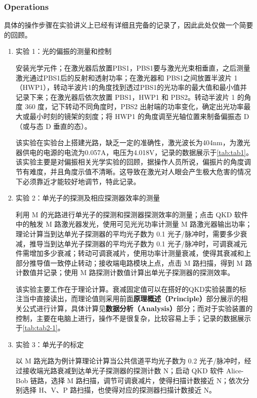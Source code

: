 \subsubsection{Operations}
具体的操作步骤在实验讲义上已经有详细且完备的记录了，因此此处仅做一个简要的回顾。
\begin{enumerate}
	\item 实验 1：光的偏振的测量和控制
	
	安装光学元件；在激光器后放置PBS1，PBS1要与激光光束相垂直，之后测量激光通过PBS1后的反射和透射功率；在激光器和 PBS1之间放置半波片 1（HWP1），转动半波片1的角度找到透过PBS1的光功率的最大值和最小值并记录下来；在激光器后依次放置 PBS1，HWP1 和 PBS2。转动半波片 1 的角度 360 度，记下转动不同角度时，PBS2 出射端的功率变化，确定出光功率最大或最小时刻的镜架的刻度；将 HWP1 的角度调至光轴位置来制备偏振态 D（或与态
	D 垂直的态）。
	
	该实验在实验台上搭建光路，缺乏一定的准确性，激光波长为404nm，为激光器供电的电源的电流为0.057A，电压为4.018V，记录的数据展示于\cref{tab:tab1}。该实验主要是对偏振相关光学实验的回顾，据操作人员所说，偏振片的角度调节有难度，并且角度示值不清晰。这导致在激光对人眼会产生极大危害的情况下必须靠近才能较好地调节，特此记录。
	
	\item 实验 2：单光子的探测及相应探测器效率的测量
	
	利用 M 的光路进行单光子的探测和探测器探测效率的测量；点击 QKD 软件中的触发 M 路激光器发光，使用可见光光功率计测量 M 路激光器输出功率；理论计算当到达单光子探测器的平均光子数为 0.1 光子/脉冲时，需要多少衰减，推导当到达单光子探测器的平均光子数为 0.1 光子/脉冲时，可调衰减元件需增加多少衰减；转动可调衰减片，使用功率计测量衰减，使得其衰减和上部分推导值一致停止转动；接收端电路模块上点，点击 M 路扫描，得到 M 路计数值并记录；使用 M 路探测计数值计算出单光子探测器的探测效率。
	
	该实验主要工作在于理论计算。衰减固定值可以在搭好的QKD实验装置的标注当中直接读出，而理论值则采用前面\textbf{原理概述（Principle）}部分展示的相关公式进行计算，具体计算见\textbf{数据分析（Analysis）}部分；而对于实验装置的控制，主要在电脑上进行，操作不是很复杂，比较容易上手；记录的数据展示于\cref{tab:tab2-1}。
	
	\item 实验 3：单光子的标定
	
	以 M 路光路为例计算理论计算当公共信道平均光子数为 0.2 光子/脉冲时，经过接收端光路衰减到达单光子探测器的探测计数 N；启动 QKD 软件 Alice-Bob 链路，选择 M 路扫描，调节可调衰减片，使得扫描计数接近 N；依次分别选择 H、V、P 路扫描，也使得对应的探测器扫描计数接近 N。
	

\end{enumerate}
